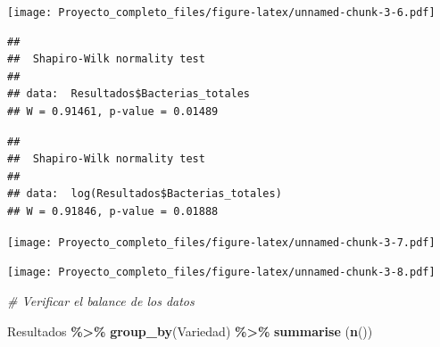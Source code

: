 \documentclass[
]{article}
\newenvironment{Shaded}{\begin{snugshade}}{\end{snugshade}}
\newcommand{\CommentTok}[1]{\textcolor[rgb]{0.56,0.35,0.01}{\textit{#1}}}
\newcommand{\FunctionTok}[1]{\textcolor[rgb]{0.13,0.29,0.53}{\textbf{#1}}}
\newcommand{\NormalTok}[1]{#1}
\newcommand{\SpecialCharTok}[1]{\textcolor[rgb]{0.81,0.36,0.00}{\textbf{#1}}}
\begin{document}
\texttt{[image: Proyecto\_completo\_files/figure-latex/unnamed-chunk-3-6.pdf]}

\begin{Shaded}
\end{Shaded}

\begin{verbatim}
## 
##  Shapiro-Wilk normality test
## 
## data:  Resultados$Bacterias_totales
## W = 0.91461, p-value = 0.01489
\end{verbatim}

\begin{Shaded}
\end{Shaded}

\begin{verbatim}
## 
##  Shapiro-Wilk normality test
## 
## data:  log(Resultados$Bacterias_totales)
## W = 0.91846, p-value = 0.01888
\end{verbatim}

\begin{Shaded}
\end{Shaded}

\texttt{[image: Proyecto\_completo\_files/figure-latex/unnamed-chunk-3-7.pdf]}

\begin{Shaded}
\end{Shaded}

\texttt{[image: Proyecto\_completo\_files/figure-latex/unnamed-chunk-3-8.pdf]}

\begin{Shaded}
\begin{Highlighting}[]
\CommentTok{\# Verificar el balance de los datos}

\NormalTok{Resultados }\SpecialCharTok{\%\textgreater{}\%}
  \FunctionTok{group\_by}\NormalTok{(Variedad) }\SpecialCharTok{\%\textgreater{}\%}
  \FunctionTok{summarise}\NormalTok{ (}\FunctionTok{n}\NormalTok{())}
\end{Highlighting}
\end{Shaded}
\end{document}
